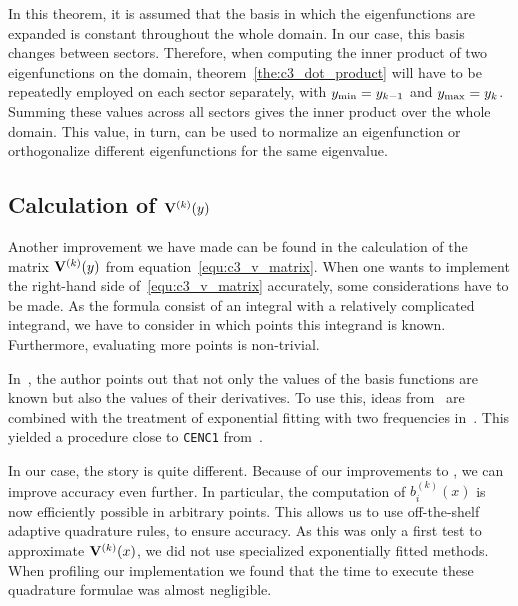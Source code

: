 In this theorem, it is assumed that the basis in which the eigenfunctions are expanded is constant throughout the whole domain. In our case, this basis changes between sectors. Therefore, when computing the inner product of two eigenfunctions on the domain, theorem~\ref{the:c3_dot_product} will have to be repeatedly employed on each sector separately, with ${y_{\text{min}}} = y_{k-1}$ and ${y_{\text{max}}} = y_k$. Summing these values across all sectors gives the inner product over the whole domain. This value, in turn, can be used to normalize an eigenfunction or orthogonalize different eigenfunctions for the same eigenvalue.

\subsection{Calculation of \texorpdfstring{$\vb{V}^{(k)}(y)$}{Vk(y)}}\label{sec:c3_calculate_vk}

Another improvement we have made can be found in the calculation of the matrix $\vb{V}^{(k)}(y)$ from equation~\eqref{equ:c3_v_matrix}. When one wants to implement the right-hand side of~\eqref{equ:c3_v_matrix} accurately, some considerations have to be made. As the formula consist of an integral with a relatively complicated integrand, we have to consider in which points this integrand is known. Furthermore, evaluating more points is non-trivial.

In~\cite{ixaru_new_2010}, the author points out that not only the values of the basis functions are known but also the values of their derivatives. To use this, ideas from~\cite{kim_quadrature_2002} are combined with the treatment of exponential fitting with two frequencies in~\cite{ixaru_operations_1997}. This yielded a procedure close to \texttt{CENC1} from~\cite{ixaru_exponential_2004}.

In our case, the story is quite different. Because of our improvements to \matslise{}, we can improve accuracy even further. In particular, the computation of $b_i^{(k)}(x)$ is now efficiently possible in arbitrary points. This allows us to use off-the-shelf adaptive quadrature rules, to ensure accuracy. As this was only a first test to approximate $\vb{V}^{(k)}(x)$, we did not use specialized exponentially fitted methods. When profiling our implementation we found that the time to execute these quadrature formulae was almost negligible.

